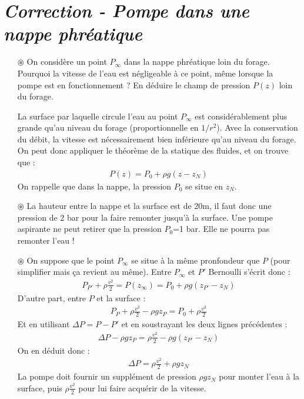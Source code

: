 \documentclass{report}
\begin{document}
\section*{\textit{Correction - Pompe dans une nappe phréatique}}

\begin{itemize}

	\item[$\circledast$] On considère un point $P_\infty$ dans la nappe phréatique loin du forage. Pourquoi la vitesse de l'eau est négligeable à ce point, même lorsque la pompe est en fonctionnement ? En déduire le champ de pression $P(z)$ loin du forage.
	
	La surface par laquelle circule l'eau au point $P_\infty$ est considérablement plus grande qu'au niveau du forage (proportionnelle en $1/r^2$). Avec la conservation du débit, la vitesse est nécessairement bien inférieure qu'au niveau du forage. On peut donc appliquer le théorème de la statique des fluides, et on trouve que :
	\begin{align*}
		P(z)=P_0+\rho g (z-z_N)
	\end{align*}
On rappelle que dans la nappe, la pression $P_0$ se situe en $z_N$.

	\item[$\circledast$] La hauteur entre la nappe et la surface est de 20m, il faut donc une pression de 2 bar pour la faire remonter jusqu'à la surface. Une pompe aspirante ne peut retirer que la pression $P_0$=1 bar. Elle ne pourra pas remonter l'eau !
	
	\item[$\circledast$] On suppose que le point $P_\infty$ se situe à la même pronfondeur que $P$ (pour simplifier mais ça revient au même). Entre  $P_\infty$ et $P'$ Bernoulli s'écrit donc :
	\begin{align*}
		P_{P'}+\rho\frac{v^2}{2}=P(z_\infty)=P_0+\rho g (z_{P'}-z_N)
	\end{align*}
	D'autre part, entre $P$ et la surface :
	\begin{align*}
		P_{P}+\rho\frac{v^2}{2}-\rho g z_{P}=P_0+\rho\frac{v^2}{2}
	\end{align*}	
	Et en utilisant $\Delta P=P-P'$ et en soustrayant les deux lignes précédentes :
	\begin{align*}
		\Delta P-\rho g z_{P}=\rho\frac{v^2}{2}-\rho g (z_{P'}-z_N)
	\end{align*}
	On en déduit donc :
	\begin{align*}
		\Delta P=\rho\frac{v^2}{2}+\rho g z_N
	\end{align*}	
	La pompe doit fournir un supplément de pression $\rho g z_N$ pour monter l'eau à la surface, puis $\rho\frac{v^2}{2}$ pour lui faire acquérir de la vitesse.
	

\end{itemize}
\end{document}

